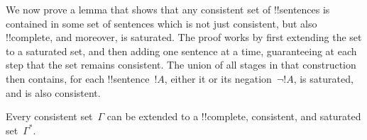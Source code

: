 \documentclass[../../../include/open-logic-section]{subfiles}
\begin{document}

We now prove a lemma that shows that any consistent set of
!!{sentence}s is contained in some set of sentences which is not just
consistent, but also !!{complete}, and moreover, is saturated. The
proof works by first extending the set to a saturated set, and then
adding one sentence at a time, guaranteeing at each step that the set
remains consistent. The union of all stages in that construction then
contains, for each !!{sentence}~$!A$, either it or its negation~$\lnot
!A$, is saturated, and is also consistent.

\begin{lem}
 Every consistent set~$\Gamma$ can be extended
to a !!{complete}, consistent, and saturated set~$\Gamma^*$.
\end{lem}
\end{document}
